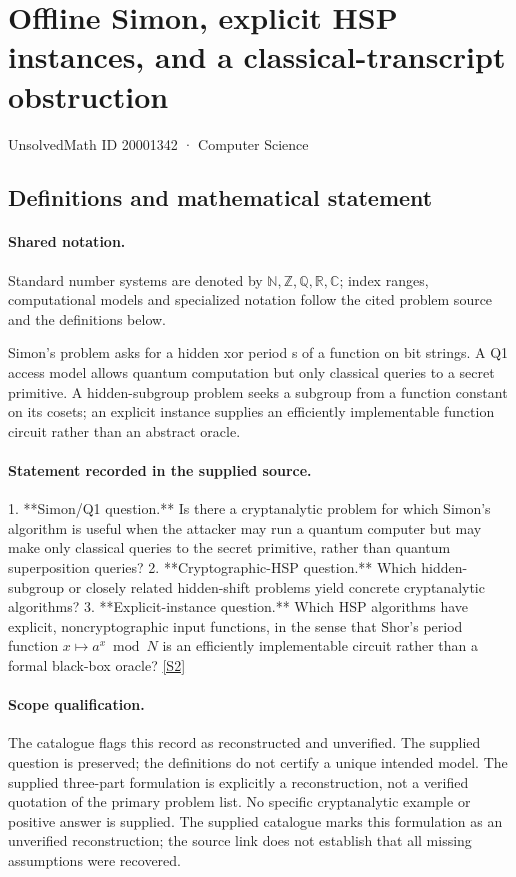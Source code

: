\documentclass[11pt]{article}
\newcommand{\sref}[2]{\hyperlink{source:#1:#2}{[S#2]}}
\begin{document}
\setcounter{section}{20001341}
\section{Offline Simon, explicit HSP instances, and a classical-transcript obstruction}\label{20001342}
{\small\sffamily UnsolvedMath ID 20001342 · Computer Science}
\subsection{Definitions and mathematical statement}

\paragraph{Shared notation.}Standard number systems are denoted by $\mathbb N,\mathbb Z,\mathbb Q,\mathbb R,\mathbb C$; index ranges, computational models and specialized notation follow the cited problem source and the definitions below.


Simon's problem asks for a hidden xor period s of a function on bit strings. A Q1 access model allows quantum computation but only classical queries to a secret primitive. A hidden-subgroup problem seeks a subgroup from a function constant on its cosets; an explicit instance supplies an efficiently implementable function circuit rather than an abstract oracle.
\paragraph{Statement recorded in the supplied source.}
1. **Simon/Q1 question.** Is there a cryptanalytic problem for which Simon's algorithm is useful when the attacker may run a quantum computer but may make only classical queries to the secret primitive, rather than quantum superposition queries?
2. **Cryptographic-HSP question.** Which hidden-subgroup or closely related hidden-shift problems yield concrete cryptanalytic algorithms?
3. **Explicit-instance question.** Which HSP algorithms have explicit, noncryptographic input functions, in the sense that Shor's period function \(x\mapsto a^x\bmod N\) is an efficiently implementable circuit rather than a formal black-box oracle? \sref{20001342}{2}
\paragraph{Scope qualification.}
The catalogue flags this record as reconstructed and unverified. The supplied question is preserved; the definitions do not certify a unique intended model. The supplied three-part formulation is explicitly a reconstruction, not a verified quotation of the primary problem list. No specific cryptanalytic example or positive answer is supplied.
The supplied catalogue marks this formulation as an unverified reconstruction; the source link does not establish that all missing assumptions were recovered.
\end{document}
